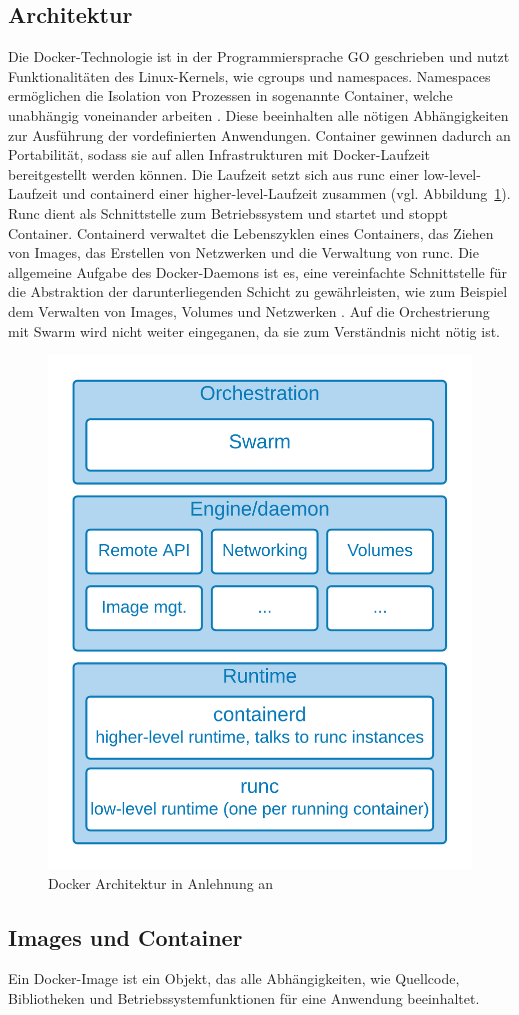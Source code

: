 \subsection{Architektur}
Die Docker-Technologie ist in der Programmiersprache GO geschrieben und nutzt Funktionalitäten des
Linux-Kernels, wie cgroups und namespaces.
Namespaces ermöglichen die Isolation von Prozessen in sogenannte Container, welche unabhängig voneinander arbeiten \cite{dockergetstarted}.
Diese beeinhalten alle nötigen Abhängigkeiten zur Ausführung der vordefinierten Anwendungen.
Container gewinnen dadurch an Portabilität,
sodass sie auf allen Infrastrukturen mit Docker-Laufzeit bereitgestellt werden können.
Die Laufzeit setzt sich aus \glqq runc\grqq{} einer low-level-Laufzeit und \glqq containerd\grqq{} einer higher-level-Laufzeit zusammen (vgl. Abbildung~\ref{fig:dockerarch}).
Runc dient als Schnittstelle zum Betriebssystem und startet und stoppt Container.
Containerd verwaltet die Lebenszyklen eines Containers, das Ziehen von Images, das Erstellen von Netzwerken und die Verwaltung von runc.
Die allgemeine Aufgabe des Docker-Daemons ist es, eine vereinfachte Schnittstelle für die Abstraktion
der darunterliegenden Schicht zu gewährleisten, wie zum Beispiel dem Verwalten von Images, Volumes und Netzwerken \cite[S.12]{dockerdeep}.
Auf die Orchestrierung mit Swarm wird nicht weiter eingeganen, da sie zum Verständnis nicht nötig ist.

\begin{figure}
    \centering
    \includegraphics[width=0.5\columnwidth]{images/DockerArch.png}
    \caption{Docker Architektur in Anlehnung an \protect\cite[S.11]{dockerdeep}}
    \label{fig:dockerarch}
\end{figure}

\subsection{Images und Container}
Ein Docker-Image ist ein Objekt, das alle Abhängigkeiten, wie Quellcode, Bibliotheken und Betriebssystemfunktionen für eine Anwendung beeinhaltet. 

